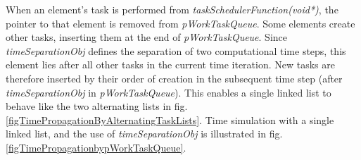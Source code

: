 	When an element's task is performed from \emph{taskSchedulerFunction(void*)}, the pointer to that element is removed from \emph{pWorkTaskQueue}. 
	Some elements create other tasks, inserting them at the end of \emph{pWorkTaskQueue}.
	Since \emph{timeSeparationObj} defines the separation of two computational time steps, this element lies after all other tasks in the current time iteration. 
	New tasks are therefore inserted by their order of creation in the subsequent time step (after \emph{timeSeparationObj} in \emph{pWorkTaskQueue}).
	This enables a single linked list to behave like the two alternating lists in fig. \ref{figTimePropagationByAlternatingTaskLists}.
	Time simulation with a single linked list, and the use of \emph{timeSeparationObj} is illustrated in fig. \ref{figTimePropagationbypWorkTaskQueue}.

% 			
% 			
